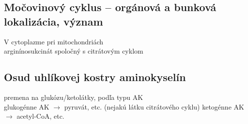 \subsection*{Močovinový cyklus -- orgánová a bunková lokalizácia, význam}
V cytoplazme pri mitochondriách\\
arginínosukcinát spoločný s citrátovým cyklom\\
\subsection*{Osud uhlíkovej kostry aminokyselín}
premena na glukózu/ketolátky, podľa typu AK\\
glukogénne AK $\rightarrow$ pyruvát, etc. (nejakú látku citrátového cyklu)
ketogénne AK $\rightarrow$ acetyl-CoA, etc.
